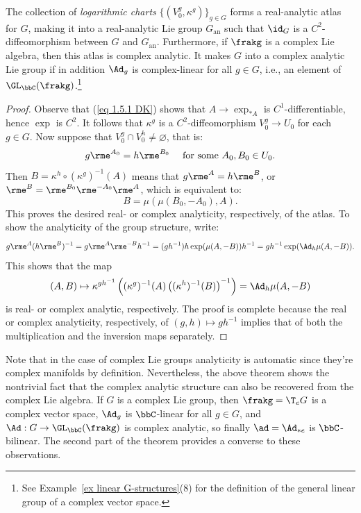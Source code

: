 \begin{thm}[{{\cite[Thm.~1.6.3]{DK}}}]\label{thm 1.6.3 DK}
    The collection of \emph{logarithmic charts} $\{(V_0^g,\kappa^g)\}_{g\in G}$ forms a real-analytic atlas for $G$, making it into a real-analytic Lie group $G_{\mathrm{an}}$ such that $\id_G$ is a $C^2$-diffeomorphism between $G$ and $G_{\mathrm{an}}$. Furthermore, if $\frakg$ is a complex Lie algebra, then this atlas is complex analytic. It makes $G$ into a complex analytic Lie group if in addition $\Ad_g$ is complex-linear for all $g\in G$, i.e., an element of $\GL_\bbC(\frakg)$.\footnote{See Example~\ref{ex linear G-structures}(8) for the definition of the general linear group of a complex vector space.}
\end{thm}
\begin{proof}
    Observe that (\ref{eq 1.5.1 DK}) shows that $A\to \exp_{\ast A}$ is $C^1$-differentiable, hence $\exp$ is $C^2$. It follows that $\kappa^g$ is a $C^2$-diffeomorphism $V^g_0\to U_0$ for each $g\in G$. Now suppose that $V_0^g\cap V^h_0\neq \varnothing$, that is:
    \[g \rme^{A_0}=h\rme^{B_0}\quad \text{ for some }A_0,B_0\in U_0.\]
    Then $B=\kappa^h\circ (\kappa^g)^{-1}(A)$ means that $g\rme^A=h\rme^B$, or $\rme^B=\rme^{B_0}\rme^{-A_0}\rme^A$, which is equivalent to:
    \[B=\mu(\mu(B_0,-A_0),A).\]
    This proves the desired real- or complex analyticity, respectively, of the atlas. To show the analyticity of the group structure, write:
    \[g \rme^A (h\rme^B)^{-1}=g\rme^A\rme^{-B}h^{-1}=(gh^{-1})h\exp(\mu(A,-B))h^{-1}=gh^{-1}\exp(\Ad_h\mu(A,-B)).\]
    This shows that the map 
    \[(A,B)\mapsto \kappa^{gh^{-1}}\left((\kappa^g)^{-1}(A)\left((\kappa^h)^{-1}(B)\right)^{-1}\right)=\Ad_h\mu(A,-B)\]
    is real- or complex analytic, respectively. The proof is complete because the real or complex analyticity, respectively, of $(g,h)\mapsto gh^{-1}$ implies that of both the multiplication and the inversion maps separately.
\end{proof}

\begin{rem}
    Note that in the case of complex Lie groups analyticity is automatic since they're complex manifolds by definition. Nevertheless, the above theorem shows the nontrivial fact that the complex analytic structure can also be recovered from the complex Lie algebra. If $G$ is a complex Lie group, then $\frakg=\T_e G$ is a complex vector space, $\Ad_g$ is $\bbC$-linear for all $g\in G$, and $\Ad:G\to \GL_\bbC(\frakg)$ is complex analytic, so finally $\ad=\Ad_{\ast e}$ is $\bbC$-bilinear. The second part of the theorem provides a converse to these observations.
\end{rem}


